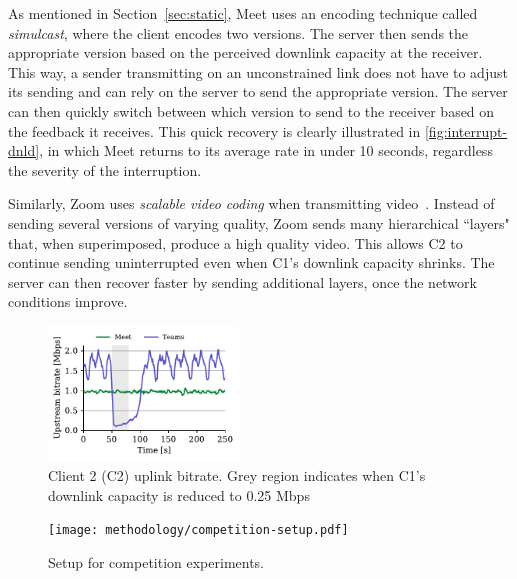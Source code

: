 As mentioned in Section~\ref{sec:static}, Meet uses an encoding technique called \textit{simulcast}, where the client encodes two versions. The server then sends the appropriate version based on the perceived downlink capacity at the receiver. This way, a sender transmitting on an unconstrained link does not have to adjust its sending and can rely on the server to send the appropriate version. The server can then quickly switch between which version to send to the receiver based on the feedback it receives. This quick recovery is clearly illustrated in \ref{fig:interrupt-dnld}, in which Meet returns to its average rate in under 10 seconds, regardless the severity of the interruption.

Similarly, Zoom uses \textit{scalable video coding} when transmitting video~\cite{zoom_encoding}. Instead of sending several versions of varying quality, Zoom sends many hierarchical ``layers" that, when superimposed, produce a high quality video. This allows C2 to continue sending uninterrupted even when C1's downlink capacity shrinks. The server can then recover faster by sending additional layers, once the network conditions improve.  


\begin{figure}[t]
    \centering
    \includegraphics[width=0.45\textwidth,keepaspectratio]{../figures/interrupt/Interrupt-sender.pdf}
    \caption{Client 2 (C2) uplink bitrate. Grey region indicates when C1's downlink capacity is reduced to 0.25 Mbps}
    \label{fig:interrupt-sender}
\end{figure}

\begin{figure}[]
   \centering
    \texttt{[image: methodology/competition-setup.pdf]}
    \caption{Setup for competition experiments.}
    \label{fig:competition-setup}
\end{figure}

